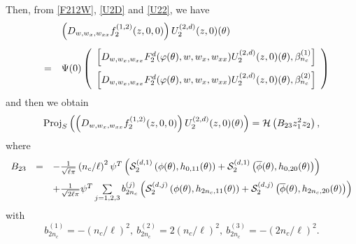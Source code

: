 \documentclass[11pt]{article}
\theoremstyle{definition}
\theoremstyle{remark}
\numberwithin{equation}{section}
\begin{document}
Then, from \eqref{F212W},  \eqref{U2D} and \eqref{U22},   we have
       $$
\begin{array}{lll}
&& \left(D_{w,w_x,w_{xx}}f^{(1,2)}_2(z,0,0)\right)U_2^{(2,d)}(z, 0)(\theta)\vspace{0.3cm}\\
 &=&\Psi(0)
   \left(\begin{array}{c}
\left[D_{w, w_x, w_{xx}}F_2^d( \varphi(\theta),  w, w_x, w_{xx}) U_2^{(2,d)}(z, 0)(\theta), \beta_{n_c}^{(1)}\right]\vspace{0.2cm}\\
\left[D_{w, w_x, w_{xx}}F_2^d( \varphi(\theta),  w, w_x, w_{xx})U_2^{(2,d)}(z, 0)(\theta), \beta_{n_c}^{(2)}\right]
\end{array}\right)
\end{array}
$$
and then  we obtain
   \begin{equation}
\label{PDWF22}
\textmd{Proj}_{S}\left(\left(D_{w,w_x,w_{xx}}f^{(1,2)}_2(z,0,0)\right)U_2^{(2,d)}(z, 0)(\theta)\right)=
\mathcal{H} \left(B_{23}z_1^2z_2\right),
 \end{equation}
where
\begin{equation}
\label{B23}
\begin{array}{lll}
B_{23}
&=& -\frac{1}{\sqrt{\ell\pi}} \left( n_c/\ell\right)^2 \psi ^T\left(\mathcal{S}_2^{(d,1)}\left(\phi (\theta), h_{0,11}(\theta)\right)+\mathcal{S}_2^{(d,1)}\left(\overline{\phi} (\theta), h_{0,20}(\theta)\right)\right)
 \vspace{0.2cm}\\
&&+\frac{1}{\sqrt{2\ell\pi}}\psi ^T\sum\limits_{j=1,2,3} b_{2n_c}^{(j)}  \left( \mathcal{S}_2^{(d,j)}\left(\phi (\theta), h_{2n_c, 11}(\theta)\right) + \mathcal{S}_2^{(d,j)}\left(\overline{\phi}(\theta), h_{2n_c, 20}(\theta)\right)\right)
\end{array}
\end{equation}
with
$$b_{2n_c}^{(1)}=-(n_c/\ell)^2, ~b_{2n_c}^{(2)}=2(n_c/\ell)^2, ~ b_{2n_c}^{(3)}=-(2n_c/\ell)^2.$$
\end{document}
